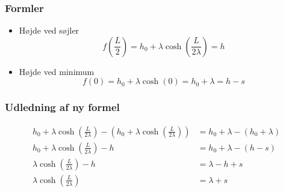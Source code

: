 \begin{frame}
\frametitle{Formler}
\begin{itemize}
\item Højde ved søjler $$f\left(\frac{L}{2}\right)	= h_0 + \lambda \cosh \left(\frac{L}{2 \lambda}\right) = h$$
\item Højde ved minimum $$f(0) =	 h_0 + \lambda 	\cosh (0)	= h_0 + \lambda = h-s$$
\end{itemize}
\end{frame}
%
\begin{frame}
\frametitle{Udledning af ny formel}
\begin{align*}
h_0 + \lambda \cosh \left(\frac{L}{2 \lambda}\right) -\left(h_0 + \lambda \cosh \left(\frac{L}{2 \lambda}\right)\right) &= h_0 + \lambda -(h_0 + \lambda)\\
h_0 + \lambda \cosh \left(\frac{L}{2 \lambda}\right) - h &= h_0 + \lambda - (h - s)\\
\lambda \cosh \left(\frac{L}{2 \lambda}\right) - h &= \lambda - h + s\\
\lambda \cosh \left(\frac{L}{2 \lambda}\right) &= \lambda + s
\end{align*}
\end{frame}